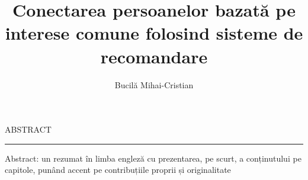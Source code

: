 \documentclass[12pt]{report}
\begin{document}
\title{Conectarea persoanelor bazată pe interese comune folosind sisteme de recomandare}					   
\author{Bucilă Mihai-Cristian}											
				
\maketitle


\newpage
\thispagestyle{empty}
\mbox{}
\newpage
{} 

\cleardoublepage
ABSTRACT
\vspace{0.5cm}	
\hrule
\vspace{0.5cm}	

Abstract: un rezumat în limba engleză cu prezentarea, pe scurt, a conținutului pe capitole, punând accent pe contribuțiile proprii și originalitate



\tableofcontents


\newpage
{}










\end{document}
